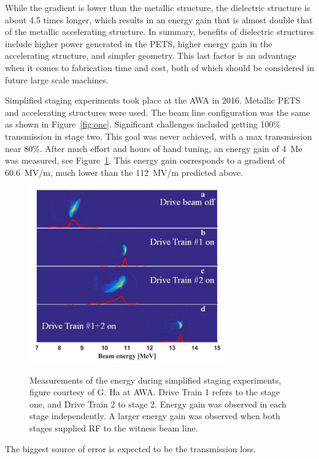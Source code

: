While the gradient is lower than the metallic structure, the dielectric 
structure is about 4.5 times longer, which results in an energy gain that is 
almost double that of the metallic accelerating structure.
In summary, benefits of dielectric structures include higher power
generated in the PETS, higher energy gain in the accelerating structure, 
and simpler geometry. This last factor is an advantage when it comes 
to fabrication time and cost, both of which should be considered
in future large scale machines. 



Simplified staging experiments took place at the AWA in 2016. 
Metallic PETS and accelerating structures were used. 
The beam line configuration was the same as shown in Figure~\ref{fig:one}.
Significant challenges included getting 100\% transmission in stage two.
This goal was never achieved, with a max transmission near 80\%. 
After much effort and hours of hand tuning, 
an energy gain of \SI{4}{Me} was measured, see Figure~\ref{fig:old-tba}. 
This energy gain corresponds to a 
gradient of \SI{60.6}{MV/m}, much lower than the \SI{112}{MV/m} predicted above.
\begin{figure}
	\centering
	\includegraphics[width=0.75\textwidth]{images/old_tba}
	\label{fig:old-tba}
	\caption{Measurements of the energy during simplified staging experiments, 
		figure courtesy of G. Ha at AWA.
		Drive Train 1 refers to the stage one, and Drive Train 2 to stage 2. 
		Energy gain was observed in each stage independently.
		A larger energy gain was observed when both stages supplied RF to the witness beam line.}
\end{figure}
The biggest source of error is expected to be the transmission loss. 




